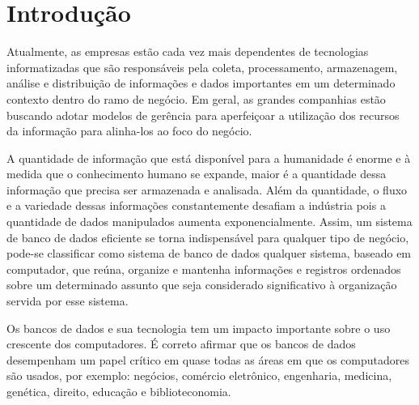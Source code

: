 \chapter{Introdução}
\label{cap1}

\vspace{-1.9cm}

Atualmente, as empresas estão cada vez mais dependentes de tecnologias informatizadas que são responsáveis pela coleta, processamento, armazenagem, análise e distribuição de informações e dados importantes em um determinado contexto dentro do ramo de negócio. Em geral, as grandes companhias estão buscando adotar modelos de gerência para aperfeiçoar a utilização dos recursos da informação para alinha-los ao foco do negócio. \cite{WEILL}

A quantidade de informação que está disponível para a humanidade é enorme e à medida que o conhecimento humano se expande, maior é a quantidade dessa informação que precisa ser armazenada e analisada. Além da quantidade, o fluxo e a variedade dessas informações constantemente desafiam a indústria pois a quantidade de dados manipulados aumenta exponencialmente. Assim, um sistema de banco de dados eficiente se torna indispensável para qualquer tipo de negócio, pode-se classificar como sistema de banco de dados qualquer sistema, baseado em computador, que reúna, organize e mantenha informações e registros ordenados sobre um determinado assunto que seja considerado significativo à organização servida por esse sistema. \cite{datebd}




Os bancos de dados e sua tecnologia tem um impacto importante sobre o uso crescente dos computadores. É correto afirmar que os bancos de dados desempenham um papel crítico em quase todas as áreas em que os computadores são usados, por exemplo: negócios, comércio eletrônico, engenharia, medicina, genética, direito, educação e biblioteconomia. \cite{navathesistemas}

